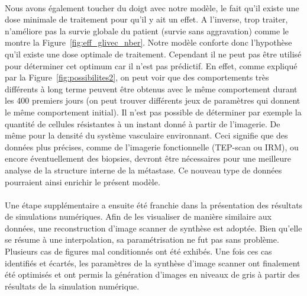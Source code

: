 \documentclass[main.tex]{subfiles}
\begin{document}
\paragraph{}
Nous avons également toucher du doigt avec notre modèle, le fait qu'il existe une dose minimale de traitement pour qu'il y ait un effet. A l'inverse, trop traiter, n'améliore pas la survie globale du patient (survie sans aggravation) comme le montre la Figure~\ref{fig:eff_glivec_nber}. Notre modèle conforte donc l'hypothèse qu'il existe une dose optimale de traitement. Cependant il ne peut pas être utilisé pour déterminer cet optimum car il n'est pas prédictif. En effet, comme expliqué par la Figure~\ref{fig:possibilites2}, on peut voir que des comportements très différents à long terme peuvent être obtenus avec le même comportement durant les 400 premiers jours (on peut trouver différents jeux de paramètres qui donnent le même comportement initial). Il n'est pas possible de déterminer par exemple la quantité de cellules résistantes à un instant donné à partir de l'imagerie. De même pour la densité du système vasculaire environnant. Ceci signifie que des données plus précises, comme de l'imagerie fonctionnelle (TEP-scan ou IRM), ou encore éventuellement des biopsies, devront être nécessaires pour une meilleure analyse de la structure interne de la métastase. Ce nouveau type de données pourraient ainsi enrichir le présent modèle.


\paragraph{}
Une étape supplémentaire a ensuite été franchie dans la présentation des résultats de simulations numériques. 
Afin de les visualiser de manière similaire aux données, une reconstruction d'image scanner de synthèse est adoptée. Bien qu'elle se résume à une interpolation, sa paramétrisation ne fut pas sans problème.  Plusieurs cas de figures mal conditionnés ont été exhibés. Une fois ces cas identifiés et écartés, les paramètres de la 
synthèse d'image scanner ont finalement été optimisés et ont permis la génération d'images en niveaux de gris à partir des résultats de la simulation numérique.
\end{document}
